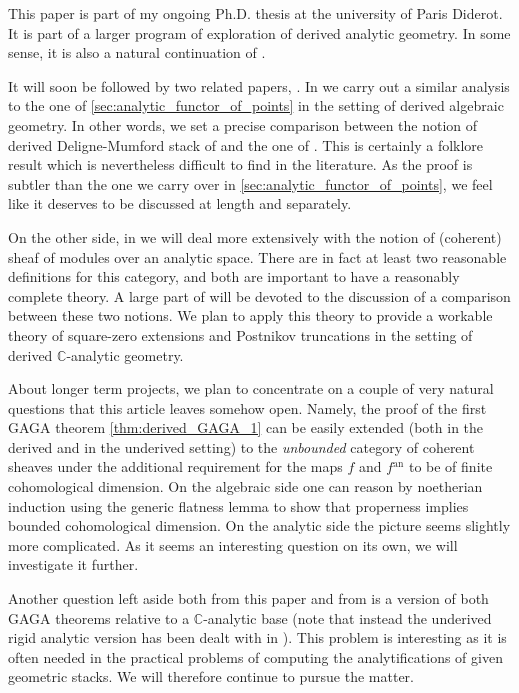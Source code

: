 \documentclass[12pt,a4paper,reqno]{amsart}
\theoremstyle{plain}
\theoremstyle{definition}
\theoremstyle{remark}
\numberwithin{equation}{section}
\begin{document}
This paper is part of my ongoing Ph.D. thesis at the university of Paris Diderot.
It is part of a larger program of exploration of derived analytic geometry.
In some sense, it is also a natural continuation of \cite{Porta_Yu_Higher_analytic_stacks_2014}.

It will soon be followed by two related papers, \cite{Porta_Comparison_2015,Porta_Analytic_deformation_2015}.
In \cite{Porta_Comparison_2015} we carry out a similar analysis to the one of \cref{sec:analytic_functor_of_points} in the setting of derived algebraic geometry.
In other words, we set a precise comparison between the notion of derived {Deligne-Mumford\xspace} stack of \cite{HAG-II} and the one of \cite{DAG-V}. This is certainly a folklore result which is nevertheless difficult to find in the literature. As the proof is subtler than the one we carry over in \cref{sec:analytic_functor_of_points}, we feel like it deserves to be discussed at length and separately.

On the other side, in \cite{Porta_Analytic_deformation_2015} we will deal more extensively with the notion of (coherent) sheaf of modules over an analytic space. 
There are in fact at least two reasonable definitions for this category, and both are important to have a reasonably complete theory. A large part of \cite{Porta_Analytic_deformation_2015} will be devoted to the discussion of a comparison between these two notions. We plan to apply this theory to provide a workable theory of square-zero extensions and Postnikov truncations in the setting of derived {$\mathbb C$-analytic\xspace} geometry.

About longer term projects, we plan to concentrate on a couple of very natural questions that this article leaves somehow open.
Namely, the proof of the first GAGA theorem \cref{thm:derived_GAGA_1} can be easily extended (both in the derived and in the underived setting) to the \emph{unbounded} category of coherent sheaves under the additional requirement for the maps $f$ and $f{^\mathrm{an}}$ to be of finite cohomological dimension.
On the algebraic side one can reason by noetherian induction using the generic flatness lemma \cite[Lemma 8.5]{Porta_Yu_Higher_analytic_stacks_2014} to show that properness implies bounded cohomological dimension. On the analytic side the picture seems slightly more complicated. As it seems an interesting question on its own, we will investigate it further.

Another question left aside both from this paper and from \cite{Porta_Yu_Higher_analytic_stacks_2014} is a version of both GAGA theorems relative to a {$\mathbb C$-analytic\xspace} base (note that instead the underived rigid analytic version has been dealt with in \cite{Porta_Yu_Higher_analytic_stacks_2014}). This problem is interesting as it is often needed in the practical problems of computing the analytifications of given geometric stacks. We will therefore continue to pursue the matter. 
\end{document}
